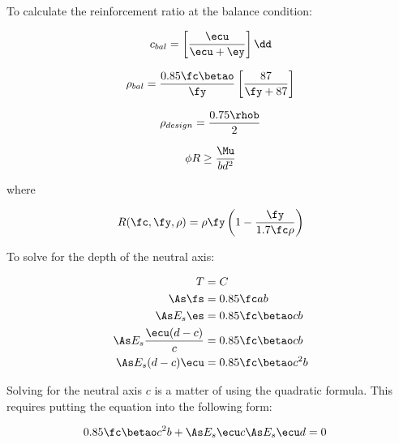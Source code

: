 To calculate the reinforcement ratio at the balance condition:

\begin{align}
	c_{bal} =
	\left[
		\frac{\ecu}{\ecu + \ey}
	\right]
	\dd
\end{align}


\begin{align}
	\rho_{bal} = 
	\frac{0.85\fc\betao}{\fy}
	\left[
		\frac{87}{\fy+87}
	\right]
\end{align}



\begin{align}
	\rho_{design}=\frac{0.75\rhob}{2}
\end{align}











\begin{align}
	\phi R \geq \frac{\Mu}{bd^2}
\end{align}

where

\begin{align}
	R(\fc,\fy,\rho) = 
	\rho \fy 
	\left(1-\frac{\fy}{1.7\fc \rho}\right)
\end{align}



To solve for the depth of the neutral axis:

\begin{align}
	T &= C\\
	\As\fs &=0.85\fc a b\\ 
	\As E_s \es &= 0.85\fc \betao c b\\
	\As E_s \frac{\ecu(d-c)}{c} &= 0.85\fc \betao c b\\
	\As E_s (d-c) \ecu &= 0.85 \fc \betao c^2 b\\ 
\end{align}

Solving for the neutral axis $c$ is a matter of using the quadratic formula. This requires putting the equation into the following form:

\begin{align}
		0.85 \fc \betao c^2 b + \As E_s \ecu c \As E_s \ecu d &= 0
\end{align}







